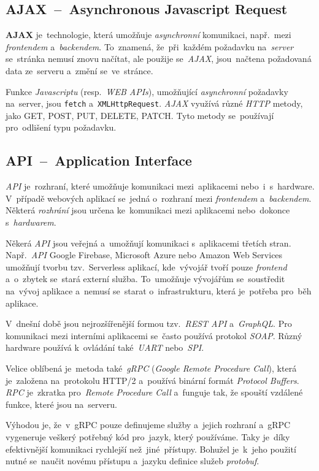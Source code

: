 \documentclass[10pt,a4paper]{article}
\begin{document}
        \subsection{AJAX~--~Asynchronous Javascript Request}
        \textbf{AJAX} je~technologie, která umožňuje \emph{asynchronní} komunikaci, např.~mezi \emph{frontendem} a~\emph{backendem}. To~znamená, že~při~každém požadavku na~\emph{server} se~stránka nemusí znovu načítat, ale použije se~\emph{AJAX}, jsou~načtena požadovaná data ze~serveru a~změní se~ve~stránce.

        Funkce \emph{Javascriptu} (resp.~\emph{WEB APIs}), umožňující \emph{asynchronní} požadavky na~server, jsou \texttt{fetch} a~\texttt{XMLHttpRequest}. \emph{AJAX} využívá různé \emph{HTTP} metody, jako GET, POST, PUT, DELETE, PATCH. Tyto metody se~používají pro~odlišení typu požadavku.\cite{ajax:mdn}

        \subsection{API~--~Application Interface}
        \emph{API} je~rozhraní, které umožňuje komunikaci mezi~aplikacemi nebo~i~s~hardware. V~případě webových aplikací se~jedná o~rozhraní mezi \emph{frontendem} a~\emph{backendem}. Některá \emph{rozhrání} jsou určena ke~komunikaci mezi aplikacemi nebo~dokonce s~\emph{hardwarem}.
        
        Někerá \emph{API} jsou veřejná a~umožňují komunikaci s~aplikacemi třetích stran. Např.~\emph{API} Google Firebase, Microsoft Azure nebo Amazon Web Services umožňují tvorbu tzv.~Serverless aplikací, kde~vývojář tvoří pouze \emph{frontend} a~o~zbytek se~stará externí služba. To~umožňuje vývojářům se~soustředit na~vývoj aplikace a~nemusí se~starat o~infrastrukturu, která je~potřeba pro~běh aplikace.

        V~dnešní době jsou nejrozšířenější formou tzv.~\emph{REST API} a~\emph{GraphQL}. Pro komunikaci mezi interními aplikacemi se~často používá protokol \emph{SOAP}. Různý hardware používá k~ovládání také~\emph{UART} nebo~\emph{SPI}.

        Velice oblíbená je~metoda také~\emph{gRPC} (\emph{Google Remote Procedure Call}), která je~založena na~protokolu HTTP/2 a~používá binární formát \emph{Protocol Buffers}. \emph{RPC} je~zkratka pro~\emph{Remote Procedure Call} a~funguje tak, že spouští vzdálené funkce, které jsou na~serveru.
        
        Výhodou je, že~v~gRPC pouze definujeme služby a~jejich rozhraní a~gRPC vygeneruje veškerý potřebný kód pro~jazyk, který používáme. Taky je~díky efektivnější komunikaci rychlejší než~jiné~přístupy. Bohužel je~k~jeho použití nutné se~naučit novému přístupu a~jazyku definice služeb \emph{protobuf}. \cite{thenewstackBuildRealWorld}
\end{document}
